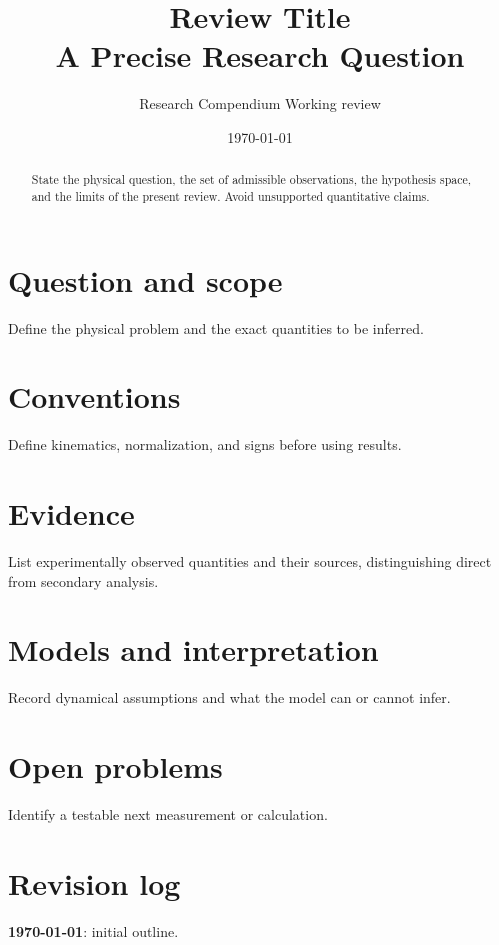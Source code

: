 \documentclass[11pt]{article}
\title{\bfseries Review Title\\[3pt]\large A Precise Research Question}
\author{Research Compendium \;\textbar\; Working review}
\date{\today}
\begin{document}
\maketitle
{}
\begin{abstract}
State the physical question, the set of admissible observations, the hypothesis space, and the limits of the present review. Avoid unsupported quantitative claims.
\end{abstract}
\tableofcontents
\clearpage
\section{Question and scope}\label{sec:question}
Define the physical problem and the exact quantities to be inferred.
\section{Conventions}\label{sec:conventions}
Define kinematics, normalization, and signs before using results.
\section{Evidence}\label{sec:evidence}
List experimentally observed quantities and their sources, distinguishing direct from secondary analysis.
\section{Models and interpretation}\label{sec:theory}
Record dynamical assumptions and what the model can or cannot infer.
\section{Open problems}\label{sec:open}
Identify a testable next measurement or calculation.
\section*{Revision log}
\textbf{\today}: initial outline.
\printbibliography[heading=bibintoc,title={References}]
\end{document}
